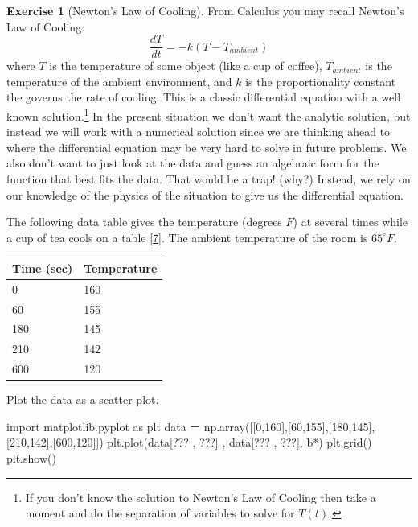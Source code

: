 \documentclass[
]{book}
\newenvironment{Shaded}{\begin{snugshade}}{\end{snugshade}}
\newcommand{\DecValTok}[1]{\textcolor[rgb]{0.00,0.00,0.81}{#1}}
\newcommand{\ImportTok}[1]{#1}
\newcommand{\NormalTok}[1]{#1}
\newcommand{\OperatorTok}[1]{\textcolor[rgb]{0.81,0.36,0.00}{\textbf{#1}}}
\newcommand{\StringTok}[1]{\textcolor[rgb]{0.31,0.60,0.02}{#1}}
\theoremstyle{definition}
\theoremstyle{definition}
\theoremstyle{definition}
\newtheorem{exercise}{Exercise}[chapter]
\theoremstyle{remark}
\begin{document}
\begin{exercise}[Newton's Law of Cooling]
\protect\hypertarget{exr:unnamed-chunk-478}{}{\label{exr:unnamed-chunk-478} {} }From Calculus you may recall Newton's Law of Cooling:
\[ \frac{dT}{dt} = -k(T - T_{ambient}) \]
where \(T\) is the temperature of some object (like a cup of coffee), \(T_{ambient}\) is the temperature of the ambient environment, and \(k\) is the proportionality constant the governs the rate of cooling. This is a classic differential equation with a well known solution.\footnote{If you don't know the solution to Newton's Law of Cooling then take a moment and do the separation of variables to solve for \(T(t)\).} In the present situation we don't want the analytic solution, but instead we will work with a numerical solution since we are thinking ahead to where the differential equation may be very hard to solve in future problems. We also don't want to just look at the data and guess an algebraic form for the function that best fits the data. That would be a trap! (why?) Instead, we rely on our knowledge of the physics of the situation to give us the differential equation.

The following data table gives the temperature (degrees \(F\)) at several times while a cup of tea cools on a table {[}\protect\hyperlink{ref-tea}{7}{]}. The ambient temperature of the room is \(65^\circ F\).

\begin{longtable}[]{@{}ll@{}}
\toprule
Time (sec) & Temperature\tabularnewline
\midrule
\endhead
0 & 160\tabularnewline
60 & 155\tabularnewline
180 & 145\tabularnewline
210 & 142\tabularnewline
600 & 120\tabularnewline
\bottomrule
\end{longtable}

Plot the data as a scatter plot.
\end{exercise}

\begin{Shaded}
\begin{Highlighting}[]
\ImportTok{import}\NormalTok{ matplotlib.pyplot }\ImportTok{as}\NormalTok{ plt}
\NormalTok{data }\OperatorTok{=}\NormalTok{ np.array([[}\DecValTok{0}\NormalTok{,}\DecValTok{160}\NormalTok{],[}\DecValTok{60}\NormalTok{,}\DecValTok{155}\NormalTok{],[}\DecValTok{180}\NormalTok{,}\DecValTok{145}\NormalTok{],[}\DecValTok{210}\NormalTok{,}\DecValTok{142}\NormalTok{],[}\DecValTok{600}\NormalTok{,}\DecValTok{120}\NormalTok{]])}
\NormalTok{plt.plot(data[??? , ???] , data[??? , ???], }\StringTok{\textquotesingle{}b*\textquotesingle{}}\NormalTok{)}
\NormalTok{plt.grid()}
\NormalTok{plt.show()}
\end{Highlighting}
\end{Shaded}
\end{document}
